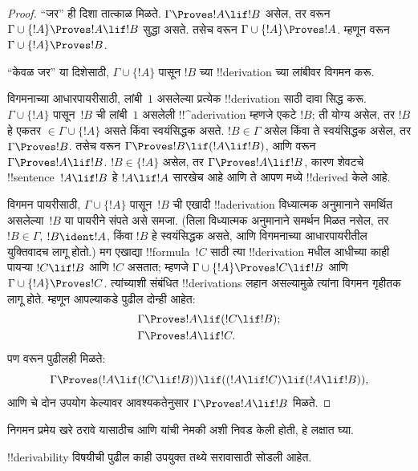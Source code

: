 \documentclass[../../../include/open-logic-section]{subfiles}
\begin{document}
\begin{proof}
``जर'' ही दिशा तात्काळ मिळते. $\Gamma \Proves !A \lif !B$ असेल, तर
 वरून $\Gamma \cup \{!A\} \Proves !A \lif !B$
सुद्धा असते. तसेच  वरून
$\Gamma \cup \{!A\} \Proves !A$. म्हणून  वरून
$\Gamma \cup \{!A\} \Proves !B$.

``केवळ जर'' या दिशेसाठी, $\Gamma \cup \{!A\}$ पासून $!B$ च्या
!!{derivation} च्या लांबीवर विगमन करू.

विगमनाच्या आधारपायरीसाठी, लांबी~$1$ असलेल्या प्रत्येक !!{derivation} साठी
दावा सिद्ध करू. $\Gamma \cup \{!A\}$ पासून~$!B$ ची लांबी~$1$ असलेली
!!^a{derivation} म्हणजे एकटे $!B$; ती योग्य असेल, तर $!B$ हे एकतर
$\in \Gamma \cup \{!A\}$ असते किंवा स्वयंसिद्धक असते. $!B \in \Gamma$
असेल किंवा ते स्वयंसिद्धक असेल, तर $\Gamma \Proves !B$. तसेच
 वरून $\Gamma \Proves !B \lif (!A \lif !B)$, आणि
 वरून $\Gamma \Proves !A \lif !B$. $!B \in \{ !A\}$
असेल, तर $\Gamma \Proves !A \lif !B$, कारण शेवटचे !!{sentence}~$!A
\lif !B$ हे $!A \lif !A$ सारखेच आहे आणि ते आपण
 मध्ये !!{derive}d केले आहे.

विगमन पायरीसाठी, $\Gamma \cup \{!A\}$ पासून~$!B$ ची एखादी
!!a{derivation} विध्यात्मक अनुमानाने समर्थित असलेल्या~$!B$ या पायरीने
संपते असे समजा. (तिला विध्यात्मक अनुमानाने समर्थन मिळत नसेल, तर
$!B \in \Gamma$, $!B \ident !A$, किंवा $!B$ हे स्वयंसिद्धक असते, आणि
विगमनाच्या आधारपायरीतील युक्तिवादच लागू होतो.) मग एखाद्या
!!{formula}~$!C$ साठी त्या !!{derivation} मधील आधीच्या काही पायऱ्या
$!C \lif !B$ आणि $!C$ असतात; म्हणजे $\Gamma \cup \{!A\} \Proves !C \lif !B$
आणि $\Gamma \cup \{!A\} \Proves !C$. त्यांच्याशी संबंधित
!!{derivation}s लहान असल्यामुळे त्यांना विगमन गृहीतक लागू होते. म्हणून
आपल्याकडे पुढील दोन्ही आहेत:
\begin{align*}
  & \Gamma \Proves !A \lif (!C \lif !B); \\
  & \Gamma \Proves !A \lif !C.
\end{align*}
पण  वरून पुढीलही मिळते:
\[
\Gamma \Proves (!A \lif (!C \lif !B)) \lif
((!A\lif !C)  \lif (!A \lif !B)),
\]
आणि  चे दोन उपयोग केल्यावर आवश्यकतेनुसार
$\Gamma \Proves !A \lif !B$ मिळते.
\end{proof}

निगमन प्रमेय खरे ठरावे यासाठीच  आणि
 यांची नेमकी अशी निवड केली होती, हे लक्षात घ्या.

!!{derivability} विषयीची पुढील काही उपयुक्त तथ्ये सरावासाठी सोडली आहेत.
\end{document}
